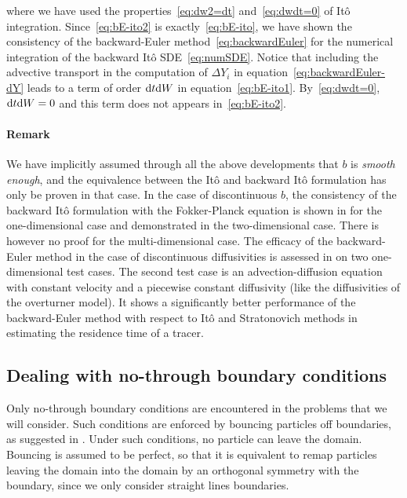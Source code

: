 where we have used the properties~\eqref{eq:dw2=dt} and~\eqref{eq:dwdt=0} of Itô integration. Since~\eqref{eq:bE-ito2} is exactly~\eqref{eq:bE-ito}, we have shown the consistency of the backward-Euler method~\eqref{eq:backwardEuler} for the numerical integration of the backward Itô SDE~\eqref{eq:numSDE}. Notice that including the advective transport in the computation of $\Delta Y_i$ in equation~\eqref{eq:backwardEuler-dY} leads to a term of order $\rm dt \rm dW$ in equation~\eqref{eq:bE-ito1}. By~\eqref{eq:dwdt=0}, $\rm dt \rm dW = 0$ and this term does not appears in~\eqref{eq:bE-ito2}. 

\paragraph{Remark} We have implicitly assumed through all the above developments that $b$ is \textit{smooth enough}, and the equivalence between the Itô and backward Itô formulation has only be proven in that case. In the case of discontinuous $b$, the consistency of the backward Itô formulation with the Fokker-Planck equation is shown in \cite{labolle2000diffusion} for the one-dimensional case and demonstrated in the two-dimensional case. There is however no proof for the multi-dimensional case. The efficacy of the backward-Euler method in the case of discontinuous diffusivities is assessed in \cite{spivakovskaya2007backward} on two one-dimensional test cases. The second test case is an advection-diffusion equation with constant velocity and a piecewise constant diffusivity (like the diffusivities of the overturner model). It shows a significantly better performance of the backward-Euler method with respect to Itô and Stratonovich methods in estimating the residence time of a tracer. %

\subsection{Dealing with no-through boundary conditions}
Only no-through boundary conditions are encountered in the problems that we will consider. Such conditions are enforced by bouncing particles off boundaries, as suggested in \cite{tompson1992particle}. Under such conditions, no particle can leave the domain. Bouncing is assumed to be perfect, so that it is equivalent to remap particles leaving the domain into the domain by an orthogonal symmetry with the boundary, since we only consider straight lines boundaries.

